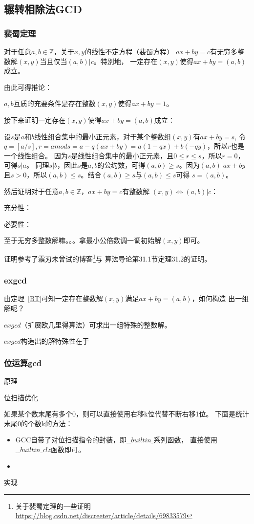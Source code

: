 \subsection{辗转相除法GCD}
\subsubsection{裴蜀定理}
\begin{theorem}\label{BT}
    对于任意$a,b\in \mathbb{Z}$，关于$x,y$的线性不定方程（裴蜀方程）
    $ax+by=c$有无穷多整数解$(x,y)$当且仅当$(a,b)|c$。特别地，
    一定存在$(x,y)$使得$ax+by=(a,b)$成立。
\end{theorem}

由此可得推论：

\begin{inference}
    $a,b$互质的充要条件是存在整数$(x,y)$使得$ax+by=1$。
\end{inference}

接下来证明一定存在$(x,y)$使得$ax+by=(a,b)$成立：

设$s$是$a$和$b$线性组合集中的最小正元素，对于某个整数组$(x,y)$有$ax+by=s$,
令$q=[a/s],r=a mod s=a-q(ax+by)=a(1-qx)+b(-qy)$，所以$r$也是一个线性组合。
因为$s$是线性组合集中的最小正元素，且$0\leq r \le s$，所以$r=0$，可得$s|a$。
同理$s|b$，因此$s$是$a,b$的公约数，可得$(a,b) \geq s$。因为$(a,b)|ax+by$
且$s>0$，所以$(a,b) \leq s$。结合$(a,b) \geq s$与$(a,b) \leq s$可得
$s=(a,b)$。

然后证明对于任意$a,b\in \mathbb{Z}$，$ax+by=c$有整数解
$(x,y) \Leftrightarrow (a,b)|c$：

充分性：

必要性：

至于无穷多整数解嘛。。。拿最小公倍数调一调初始解$(x,y)$即可。

证明参考了霜刃未曾试的博客\footnote{关于裴蜀定理的一些证明\\
\url{https://blog.csdn.net/discreeter/article/details/69833579}}与
算法导论\cite{ITA3}第31.1节定理31.2的证明。
\subsubsection{exgcd}
由定理~\ref{BT}可知一定存在整数解$(x,y)$满足$ax+by=(a,b)$，如何构造
出一组解呢？

$exgcd$（扩展欧几里得算法）可求出一组特殊的整数解。

$exgcd$构造出的解特殊性在于

\subsubsection{位运算gcd}
原理

位扫描优化

如果某个数末尾有多个0，则可以直接使用右移k位代替不断右移1位。
下面是统计末尾0的个数k的方法：

\begin{itemize}
    \item GCC自带了对位扫描指令的封装，即$\_\_builtin\_$系列函数，
    直接使用$\_\_builtin\_clz$函数即可。
    \item
\end{itemize}

实现
